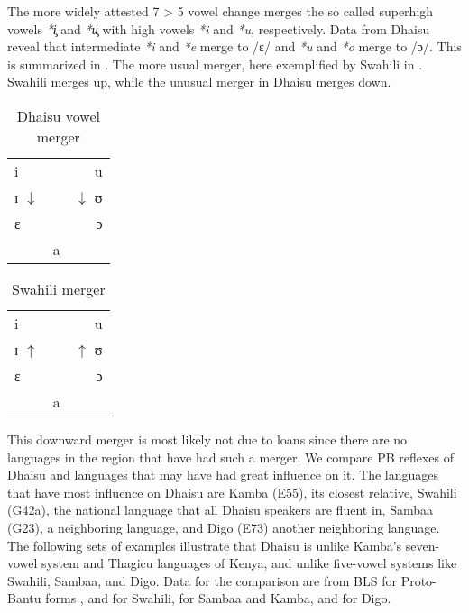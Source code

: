 \documentclass[output=paper,colorlinks,citecolor=brown]{langscibook}
\begin{document}
The more widely attested 7 > 5 vowel change merges the so called superhigh vowels \textit{*i̧} and \textit{*u̧} with high vowels \textit{*i} and \textit{*u}, respectively. Data from Dhaisu reveal that intermediate \textit{*i} and \textit{*e }merge to /ɛ/ and \textit{*u} and \textit{*o} merge to /ɔ/. This is summarized in . The more usual merger, here exemplified by Swahili in . Swahili merges up, while the unusual merger in Dhaisu merges down.

\begin{table}
	\caption{Dhaisu vowel merger}
	\label{tab:ngonyani:4}
    \begin{tabular}{lcr}
        i               &   & u\\
        ɪ $\downarrow$  &   & $\downarrow$ ʊ\\
        ɛ               &   & ɔ\\
                        & a &\\
    \end{tabular}
\end{table}	

\begin{table}
	\caption{Swahili merger}
    \label{tab:ngonyani:5}
    \begin{tabular}{lcr}
        i               &   & u\\
        ɪ $\uparrow$    &   & $\uparrow$  ʊ\\
        ɛ               &   & ɔ\\
                        & a &\\
    \end{tabular}
\end{table}

This downward merger is most likely not due to loans since there are no languages in the region that have had such a merger. 
We compare PB reflexes of Dhaisu and languages that may have had great influence on it. The languages that have most influence on Dhaisu are Kamba (E55), its closest relative, Swahili (G42a), the national language that all Dhaisu speakers are fluent in, Sambaa (G23), a neighboring language, and Digo (E73) another neighboring language. The following sets of examples illustrate that Dhaisu is unlike Kamba's seven-vowel system and Thagicu languages of Kenya, and unlike five-vowel systems like Swahili, Sambaa, and Digo. Data for the comparison are from BLS for Proto-Bantu forms  \citep{BastinEtAl2002}, \cite{NurseHinnebusch1993}  and \cite{TUKI1996} for Swahili, \cite{NursePhilippson1975} for  Sambaa and Kamba, and \cite{MwalonyaEtAl2004} for Digo.
\end{document}
